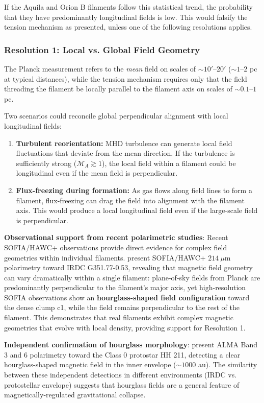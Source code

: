 \documentclass[11pt,a4paper]{article}
\begin{document}
If the Aquila and Orion B filaments follow this statistical trend, the probability that they have predominantly longitudinal fields is low. This would falsify the tension mechanism as presented, unless one of the following resolutions applies.

\subsubsection{Resolution 1: Local vs. Global Field Geometry}

The Planck measurement refers to the \emph{mean} field on scales of $\sim 10'$--$20'$ ($\sim 1$--$2$ pc at typical distances), while the tension mechanism requires only that the field threading the filament be locally parallel to the filament axis on scales of $\sim 0.1$--$1$ pc.

Two scenarios could reconcile global perpendicular alignment with local longitudinal fields:
\begin{enumerate}
    \item \textbf{Turbulent reorientation:} MHD turbulence can generate local field fluctuations that deviate from the mean direction. If the turbulence is sufficiently strong ($\mathcal{M}_A \gtrsim 1$), the local field within a filament could be longitudinal even if the mean field is perpendicular.
    \item \textbf{Flux-freezing during formation:} As gas flows along field lines to form a filament, flux-freezing can drag the field into alignment with the filament axis. This would produce a local longitudinal field even if the large-scale field is perpendicular.
\end{enumerate}

\textbf{Observational support from recent polarimetric studies}: Recent SOFIA/HAWC+ observations provide direct evidence for complex field geometries within individual filaments. \citet{Jadhav2026} present SOFIA/HAWC+ $214~\mu$m polarimetry toward IRDC G351.77-0.53, revealing that magnetic field geometry can vary dramatically within a single filament: plane-of-sky fields from Planck are predominantly perpendicular to the filament's major axis, yet high-resolution SOFIA observations show an \textbf{hourglass-shaped field configuration} toward the dense clump c1, while the field remains perpendicular to the rest of the filament. This demonstrates that real filaments exhibit complex magnetic geometries that evolve with local density, providing support for Resolution 1.

\textbf{Independent confirmation of hourglass morphology}: \citet{Choi2025} present ALMA Band 3 and 6 polarimetry toward the Class 0 protostar HH 211, detecting a clear hourglass-shaped magnetic field in the inner envelope ($\sim1000$ au). The similarity between these independent detections in different environments (IRDC vs. protostellar envelope) suggests that hourglass fields are a general feature of magnetically-regulated gravitational collapse.
\end{document}
